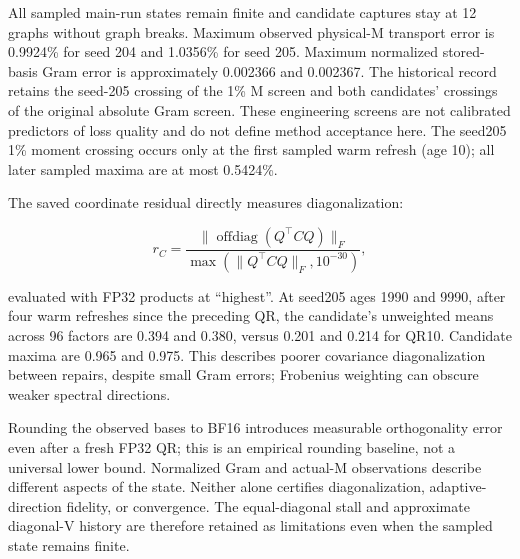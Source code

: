 All sampled main-run states remain finite and candidate captures stay at
12 graphs without graph breaks. Maximum observed physical-M transport
error is 0.9924\% for seed 204 and 1.0356\% for seed 205. Maximum
normalized stored-basis Gram error is approximately 0.002366 and
0.002367. The historical record retains the seed-205 crossing of the 1\%
M screen and both candidates' crossings of the original absolute Gram
screen. These engineering screens are not calibrated predictors of loss
quality and do not define method acceptance here. The seed205 1\% moment
crossing occurs only at the first sampled warm refresh (age 10); all
later sampled maxima are at most 0.5424\%.

The saved coordinate residual directly measures diagonalization:

\[
r_C=\frac{\|\operatorname{offdiag}(Q^\top C Q)\|_F}
{\max(\|Q^\top C Q\|_F,10^{-30})},
\]

evaluated with FP32 products at ``highest''. At seed205 ages 1990 and
9990, after four warm refreshes since the preceding QR, the candidate's
unweighted means across 96 factors are 0.394 and 0.380, versus 0.201 and
0.214 for QR10. Candidate maxima are 0.965 and 0.975. This describes
poorer covariance diagonalization between repairs, despite small Gram
errors; Frobenius weighting can obscure weaker spectral directions.

Rounding the observed bases to BF16 introduces measurable
orthogonality error even after a fresh FP32 QR; this is an empirical
rounding baseline, not a universal lower bound. Normalized Gram and
actual-M observations describe different aspects of the state. Neither
alone certifies diagonalization, adaptive-direction fidelity, or
convergence. The equal-diagonal stall and approximate diagonal-V history
are therefore retained as limitations even when the sampled state
remains finite.
